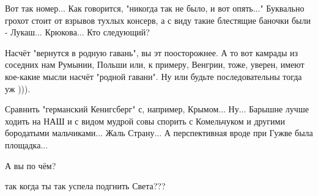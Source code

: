 \begin{itemize}
 

Вот так номер... Как говорится, "никогда так не было, и вот опять..." Буквально
грохот стоит от взрывов тухлых консерв, а с виду такие блестящие баночки были -
Лукаш... Крюкова... Кто следующий?

 

Насчёт "вернутся в родную гавань", вы эт поосторожнее. А то вот камрады из
соседних нам Румынии, Польши или, к примеру, Венгрии, тоже, уверен, имеют
кое-какие мысли насчёт "родной гавани". Ну или будьте последовательны тогда уж
))).


 

Сравнить "германский Кенигсберг" с, например, Крымом... Ну... Барышне лучше
ходить на НАШ и с видом мудрой совы спорить с Комельчуком и другими бородатыми
мальчиками... Жаль Страну... А перспективная вроде при Гужве была площадка...

 
А вы по чём?

 
так когда ты так успела подгнить Света???

 


\end{itemize}
